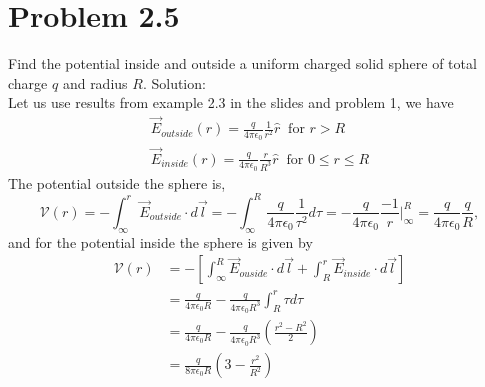 \section{Problem 2.5}
Find the potential inside and outside a uniform charged solid sphere of total charge $q$ and radius $R$. Solution: \\
Let us use results from example 2.3 in the slides and problem 1, we have
\begin{align}
	\vec{E}_{outside}(r)=\frac{q}{4\pi\epsilon_0}\frac{1}{r^2}\hat{r}\;\;\text{for } r>R \\
	\vec{E}_{inside}(r) =\frac{q}{4\pi\epsilon_0}\frac{r}{R^3}\hat{r}\;\;\text{for } 0\leq r\leq R
\end{align}
The potential outside the sphere is,
\begin{equation}
	\mathcal{V}(r) = -\int_{\infty}^{r} \vec{E}_{outside}\cdot d\vec{l}
							= -\int_{\infty}^{R} \frac{q}{4\pi\epsilon_0}\frac{1}{\tau^2}d\tau
							= -\frac{q}{4\pi\epsilon_0}\frac{-1}{r}|_{\infty}^{R}
							= \frac{q}{4\pi\epsilon_0}\frac{q}{R},
\end{equation}
and for the potential inside the sphere is given by
\begin{align}
	\mathcal{V}(r) &= -\left[\int_{\infty}^{R} \vec{E}_{ouside}\cdot d\vec{l} 
								+ \int_{R}^{r} \vec{E}_{inside} \cdot d\vec{l}\right]\\
							&= \frac{q}{4\pi\epsilon_0 R} 
								- \frac{q}{4\pi\epsilon_0 R^3} \int_R^r \tau d\tau \\
							&= \frac{q}{4\pi\epsilon_0 R}
								- \frac{q}{4\pi\epsilon_0 R^3} \left(\frac{r^2-R^2}{2}\right) \\
							&= \frac{q}{8\pi\epsilon_0 R}\left(3-\frac{r^2}{R^2}\right)
\end{align}


